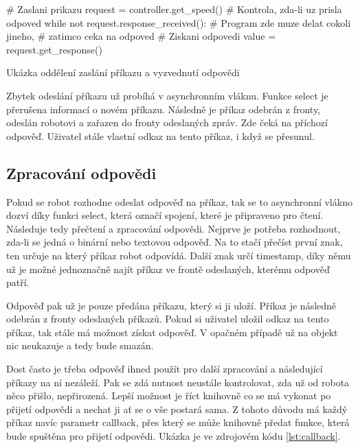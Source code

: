 \documentclass[12pt,notitlepage]{report}
\begin{document}
    \begin{listing}[H]
    \begin{pyc}
# Zaslani prikazu
request = controller.get_speed()
# Kontrola, zda-li uz prisla odpoved
while not request.response_received():
    # Program zde muze delat cokoli jineho,
    # zatimco ceka na odpoved
# Ziskani odpovedi
value = request.get_response()
    \end{pyc}
    \caption{Ukázka oddělení zaslání příkazu a vyzvednutí odpovědi}
    \end{listing}

    Zbytek odeslání příkazu už probíhá v asynchronním vláknu. Funkce select je
    přerušena informací o novém příkazu. Následně je příkaz odebrán z fronty,
    odeslán robotovi a zařazen do fronty odeslaných zpráv. Zde čeká na příchozí
    odpověď. Uživatel stále vlastní odkaz na tento příkaz, i když se přesunul.

    \subsection{Zpracování odpovědi}

    Pokud se robot rozhodne odeslat odpověď na příkaz, tak se to asynchronní
    vlákno dozví díky funkci select, která označí spojení, které je připraveno
    pro čtení. Následuje tedy přečtení a zpracování odpovědi. Nejprve je
    potřeba rozhodnout, zda-li se jedná o binární nebo textovou odpověď. Na to
    stačí přečíst první znak, ten určuje na který příkaz robot odpovídá. Další
    znak určí timestamp, díky němu už je možné jednoznačně najít příkaz ve
    frontě odeslaných, kterému odpověď patří.

    Odpověď pak už je pouze předána příkazu, který si ji uloží. Příkaz je
    následně odebrán z fronty odeslaných příkazů. Pokud si uživatel uložil
    odkaz na tento příkaz, tak stále má možnost získat odpověď. V opačném
    případě už na objekt nic neukazuje a tedy bude smazán.

    Dost často je třeba odpověď ihned použít pro další zpracování a následující
    příkazy na ní nezáleží. Pak se zdá nutnost neustále kontrolovat, zda už od
    robota něco přišlo, nepřirozená. Lepší možnost je říct knihovně co se má
    vykonat po přijetí odpovědi a nechat ji ať se o vše postará sama. Z tohoto
    důvodu má každý příkaz navíc parametr callback, přes který se může knihovně
    předat funkce, která bude spuštěna pro přijetí odpovědi. Ukázka je ve
    zdrojovém kódu \ref{lst:callback}.
\end{document}
